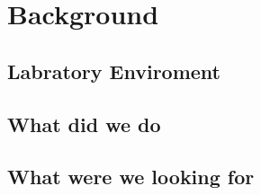 \section{Background}
\lipsum[1-2]
\subsection{Labratory Enviroment}
\lipsum[4-5]
\subsection{What did we do}
\lipsum[6]
\subsection{What were we looking for}
\lipsum[7]